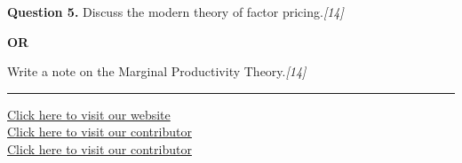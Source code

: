 \documentclass[11pt,a4paper]{article}
\newcommand{\pts}[1]{\hfill   \textit{[#1]}}
\begin{document}
\noindent   \textbf{Question 5.}
Discuss the modern theory of factor pricing.\pts{14}

\centerline{   \textbf{OR}}

Write a note on the Marginal Productivity Theory.\pts{14}

\vfill
\rule{\linewidth}{0.4pt}

\begin{center}\small
\href{https://bhu-exam.vercel.app/}{Click here to visit our website}\\[4pt]
\href{https://me-aryan.vercel.app/}{Click here to visit our contributor}\\[4pt]
\href{https://quashan-me.vercel.app/}{Click here to visit our contributor}
\end{center}
\end{document}
